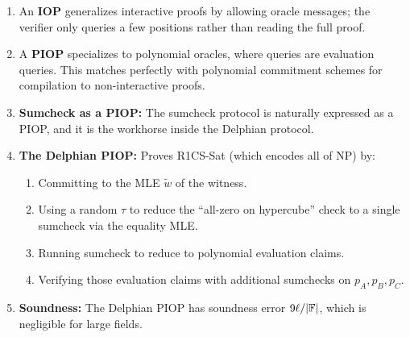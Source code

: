 \documentclass[11pt]{article}
\begin{document}
\begin{enumerate}
  \item An \textbf{IOP} generalizes interactive proofs by allowing oracle
    messages; the verifier only queries a few positions rather than reading the
    full proof.
  \item A \textbf{PIOP} specializes to polynomial oracles, where queries are
    evaluation queries. This matches perfectly with polynomial commitment schemes
    for compilation to non-interactive proofs.
  \item \textbf{Sumcheck as a PIOP:} The sumcheck protocol is naturally expressed
    as a PIOP, and it is the workhorse inside the Delphian protocol.
  \item \textbf{The Delphian PIOP:} Proves R1CS-Sat (which encodes all of NP)
    by:
    \begin{enumerate}[label=(\alph*)]
      \item Committing to the MLE $\tilde{w}$ of the witness.
      \item Using a random $\tau$ to reduce the ``all-zero on hypercube'' check
        to a single sumcheck via the equality MLE.
      \item Running sumcheck to reduce to polynomial evaluation claims.
      \item Verifying those evaluation claims with additional sumchecks on
        $p_A, p_B, p_C$.
    \end{enumerate}
  \item \textbf{Soundness:} The Delphian PIOP has soundness error
    $9\ell/|\mathbb{F}|$, which is negligible for large fields.
\end{enumerate}
\end{document}
